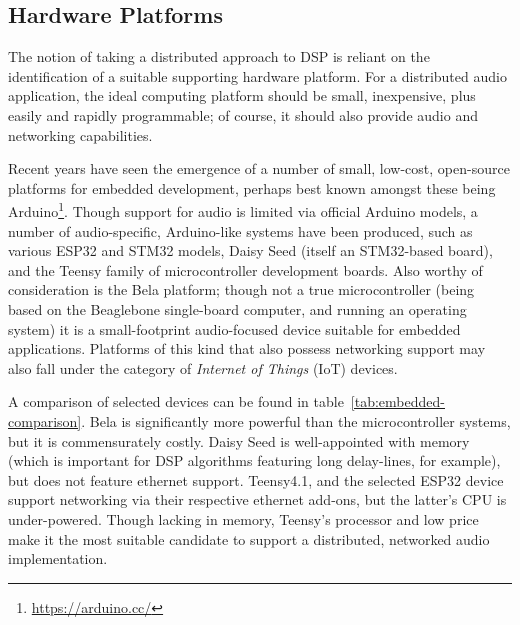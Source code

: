 \subsection{Hardware Platforms}\label{subsec:hardware-platforms}

The notion of taking a distributed approach to DSP is reliant on the
identification of a suitable supporting hardware platform.
For a distributed audio application, the ideal computing platform should be
small, inexpensive, plus easily and rapidly programmable; of course, it should
also provide audio and networking capabilities.

Recent years have seen the emergence of a number of small, low-cost, open-source
platforms for embedded development, perhaps best known amongst these being
Arduino\footnote{\url{https://arduino.cc/}}.
Though support for audio is limited via official Arduino models, a number of
audio-specific, Arduino-like systems have been produced, such as various
ESP32 and STM32 models, Daisy Seed (itself an STM32-based board), and the Teensy
family of microcontroller development boards.
Also worthy of consideration is the Bela platform; though not a true
microcontroller (being based on the Beaglebone single-board computer, and
running an operating system) it is a small-footprint audio-focused device
suitable for embedded applications.
Platforms of this kind that also possess networking support may also fall
under the category of \textit{Internet of Things} (IoT) devices.

A comparison of selected devices can be found in
table~\ref{tab:embedded-comparison}.
Bela is significantly more powerful than the microcontroller systems, but it is
commensurately costly.
Daisy Seed is well-appointed with memory (which is important for DSP algorithms
featuring long delay-lines, for example), but does not feature ethernet support.
Teensy4.1, and the selected ESP32 device support networking via their
respective ethernet add-ons, but the latter's CPU is under-powered.
Though lacking in memory, Teensy's processor and low price make it the most
suitable candidate to support a distributed, networked audio implementation.

